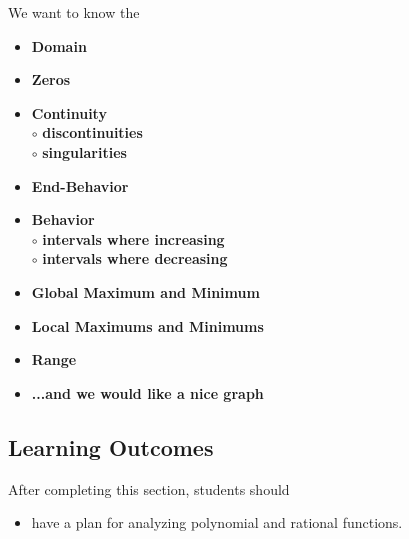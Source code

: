 \documentclass{ximera}
\begin{document}
We want to know the 
\begin{itemize}
     \item \textbf{\textcolor{red!70!black}{Domain}} 
     \item \textbf{\textcolor{red!70!black}{Zeros}} 
     \item \textbf{\textcolor{red!70!black}{Continuity}} \\
     \text{    }$\circ$ \textbf{\textcolor{purple!85!blue}{discontinuities}}\\
     \text{    }$\circ$ \textbf{\textcolor{purple!85!blue}{singularities}}\\
     \item \textbf{\textcolor{red!70!black}{End-Behavior}} 
     \item \textbf{\textcolor{red!70!black}{Behavior}} \\
     \text{    }$\circ$ \textbf{\textcolor{purple!85!blue}{intervals where increasing}}\\
     \text{    }$\circ$ \textbf{\textcolor{purple!85!blue}{intervals where decreasing}}\\
     \item \textbf{\textcolor{red!70!black}{Global Maximum and Minimum}} 
     \item \textbf{\textcolor{red!70!black}{Local Maximums and Minimums}} 
     \item \textbf{\textcolor{red!70!black}{Range}} 
     \item \textbf{\textcolor{blue!55!black}{...and we would like a nice graph}} 
\end{itemize}









\subsection*{Learning Outcomes}

\begin{sectionOutcomes}
After completing this section, students should 

\begin{itemize}
\item have a plan for analyzing polynomial and rational functions.
\end{itemize}
\end{sectionOutcomes}
\end{document}

